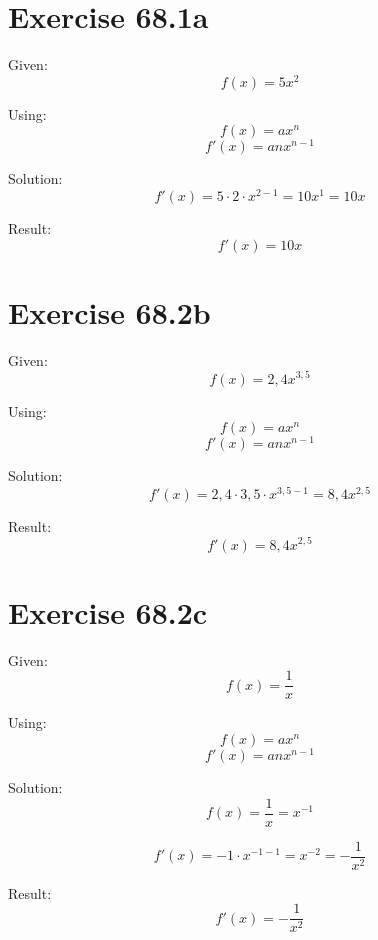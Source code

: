 \documentclass[a4paper, 10pt]{scrartcl}
\begin{document}
\section{Exercise 68.1a}

Given:
\[f(x) = 5x^{2}\]

Using:
\[f(x) = ax^{n}\]
\[f'(x) = anx^{n - 1}\]

Solution:
\[f'(x) = 5\cdot2\cdot x^{2 - 1} = 10x^{1} = 10x\]

Result:
\[f'(x) = 10x\]

\section{Exercise 68.2b}

Given:
\[f(x) = 2,4x^{3,5}\]

Using:
\[f(x) = ax^{n}\]
\[f'(x) = anx^{n - 1}\]

Solution:
\[f'(x) = 2,4\cdot3,5\cdot x^{3,5 - 1} = 8,4x^{2,5}\]

Result:
\[f'(x) = 8,4x^{2,5}\]

\section{Exercise 68.2c}

Given:
\[f(x) = \frac{1}{x}\]

Using:
\[f(x) = ax^{n}\]
\[f'(x) = anx^{n - 1}\]

Solution:
\[f(x) = \frac{1}{x} = x^{-1}\]

\[f'(x) = -1\cdot x^{-1 - 1} = x^{-2} = -\frac{1}{x^{2}}\]

Result:
\[f'(x) = -\frac{1}{x^{2}}\]
\end{document}
